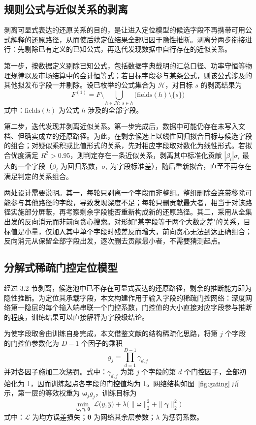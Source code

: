 \documentclass[UTF8,zihao=5,twoside,fontset=none]{ctexart}
\begin{document}
\subsection{规则公式与近似关系的剥离}

剥离可显式表达的还原关系的目的，是让进入定位模型的候选字段不再携带可用公式解释的还原路径，从而使后续定位结果全部归因于隐性推断。剥离分两步衔接进行：先剔除已有定义的已知公式，再迭代发现数据中自行存在的近似关系。

第一步，按数据定义剔除已知公式，包括数据字典载明的汇总口径、功率守恒等物理规律以及市场结算中的会计恒等式；若目标字段参与某条公式，则该公式涉及的其他拟发布字段一并剔除。设已枚举的公式集合为 $\mathcal{H}$，对目标 $s$ 的剥离结果为
\begin{equation}
F^{(1)}=F\setminus\bigcup_{h\in\mathcal{H}:\,s\in h}\big(\mathrm{fields}(h)\setminus\{s\}\big)
\end{equation}
式中：$\mathrm{fields}(h)$ 为公式 $h$ 涉及的全部字段。

第二步，迭代发现并剥离近似关系。第一步完成后，数据中可能仍存在未写入文档、但确实成立的还原路径。为此，在剩余候选上以线性回归拟合目标与候选字段的组合；对疑似乘积或比值形式的关系，先对相应字段取对数化为线性形式。若拟合优度满足 $R^2>0.95$，则判定存在一条近似关系，剥离其中标准化贡献 $|\beta_i|\sigma_i$ 最大的一个字段（$\beta_i$ 为回归系数，$\sigma_i$ 为字段标准差），随后重新拟合，直至不再存在满足判定的关系组合。

两处设计需要说明。其一，每轮只剥离一个字段而非整组。整组删除会连带移除可能参与其他路径的字段，导致发现深度不足；每轮只删贡献最大者，相当于对该路径实施部分屏蔽，再考察剩余字段能否重新构成新的还原路径。其二，采用从全集出发的反向消元而非前向贪心搜索。对形如"某字段等于两个大数之差"的关系，目标值是小量，仅加入其中单个字段时残差反而增大，前向贪心无法到达正确组合；反向消元从保留全部字段出发，逐次删去贡献最小者，不需要猜测起点。

\subsection{分解式稀疏门控定位模型}

经过 3.2 节剥离，候选池中已不存在可显式表达的还原路径，剩余的推断能力即为隐性推断。为定位其承载字段，本文构建作用于输入字段的稀疏门控网络：深度网络第一隐层的每个输入端串联一个门控系数，门控值的大小直接对应字段参与推断的程度，训练结果可以直接解释为字段级结论。

为使字段取舍由训练自身完成，本文借鉴文献\cite{ref-dgating}的结构稀疏化思路，将第 $j$ 个字段的门控值参数化为 $D-1$ 个因子的乘积
\begin{equation}
g_j=\prod_{d=1}^{D-1}\gamma_{d,j}
\end{equation}
并对各因子施加二次惩罚。式中：$\gamma_{d,j}$ 为第 $j$ 个字段的第 $d$ 个门控因子，全部初始化为 1，因而训练起点各字段的门控值均为 1。网络结构如图~\ref{fig:gating} 所示，第一层的等效权重为 $\bm{\omega}_j g_j$，训练目标为
\begin{equation}
\min_{\bm{\omega},\bm{\gamma},\bm{\theta}}\ \mathcal{L}\big(y,\hat y\big)
+\lambda\Big(\|\bm{\omega}\|_2^2+\|\bm{\gamma}\|_2^2\Big)
\end{equation}
式中：$\mathcal{L}$ 为均方误差损失；$\bm{\theta}$ 为网络其余层参数；$\lambda$ 为惩罚系数。
\end{document}

